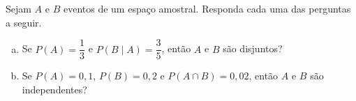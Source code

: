 %
%


\begin{exercicioBanco}[\valorquestao]
Sejam \(A\) e \(B\) eventos de um espaço amostral. Responda cada uma das perguntas a seguir.
%
\begin{enumerate}[(a)]
    \item Se \(P(A) = \dfrac{1}{3}\) e \(P(B \mid A) = \dfrac{3}{5}\), então \(A\) e \(B\) são disjuntos?
    \item Se \(P(A) = 0,1\), \(P(B) = 0,2\) e \(P(A\cap B) = 0,02\), então \(A\) e \(B\) são independentes?
\end{enumerate}
%
\end{exercicioBanco}

